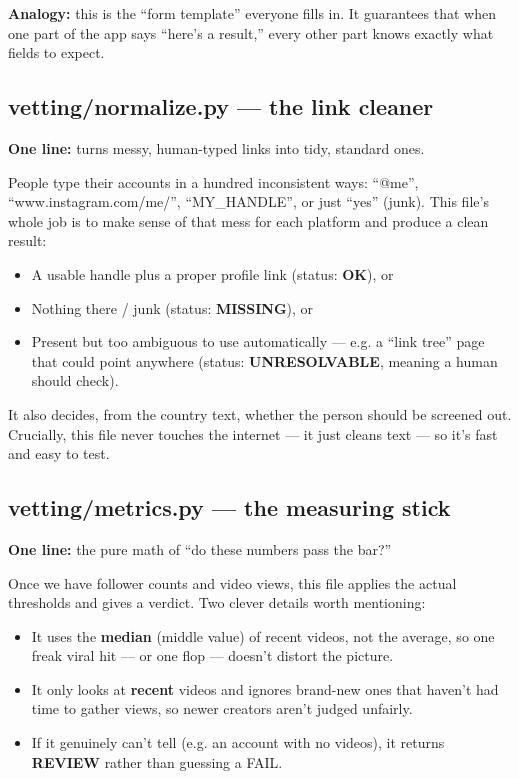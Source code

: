 \documentclass[11pt]{article}
\newcommand{\term}[1]{\textbf{\color{brandpurple}#1}}
\begin{document}
\begin{analogybox}
\textbf{Analogy:} this is the ``form template'' everyone fills in. It guarantees
that when one part of the app says ``here's a result,'' every other part knows
exactly what fields to expect.
\end{analogybox}

\subsection{vetting/normalize.py — the link cleaner}
\begin{plainbox}
\textbf{One line:} turns messy, human-typed links into tidy, standard ones.
\end{plainbox}

People type their accounts in a hundred inconsistent ways: ``@me'',
``www.instagram.com/me/'', ``MY\_HANDLE'', or just ``yes'' (junk). This file's
whole job is to make sense of that mess for each platform and produce a clean
result:
\begin{itemize}
  \item A usable handle plus a proper profile link (status: \term{OK}), or
  \item Nothing there / junk (status: \term{MISSING}), or
  \item Present but too ambiguous to use automatically — e.g. a ``link tree''
  page that could point anywhere (status: \term{UNRESOLVABLE}, meaning a human
  should check).
\end{itemize}

It also decides, from the country text, whether the person should be screened
out. Crucially, this file never touches the internet — it just cleans text — so
it's fast and easy to test.

\subsection{vetting/metrics.py — the measuring stick}
\begin{plainbox}
\textbf{One line:} the pure math of ``do these numbers pass the bar?''
\end{plainbox}

Once we have follower counts and video views, this file applies the actual
thresholds and gives a verdict. Two clever details worth mentioning:
\begin{itemize}
  \item It uses the \textbf{median} (middle value) of recent videos, not the
  average, so one freak viral hit — or one flop — doesn't distort the picture.
  \item It only looks at \textbf{recent} videos and ignores brand-new ones that
  haven't had time to gather views, so newer creators aren't judged unfairly.
  \item If it genuinely can't tell (e.g. an account with no videos), it returns
  \term{REVIEW} rather than guessing a FAIL.
\end{itemize}
\end{document}
